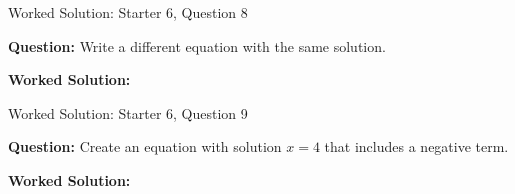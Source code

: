 \documentclass{beamer}
\newcommand{\ashow}[1]{\uncover<2->{\textcolor{red}{\small #1}}}
\begin{document}
\begin{frame}{Worked Solution: Starter 6, Question 8}

\textbf{Question:} Write a different equation with the same solution.

\textbf{Worked Solution:} \ashow{Since $3x+4=16$ gives $x=4$, a different equation is $2x+3=11$, which also gives $x=4$.}

\end{frame}

\begin{frame}{Worked Solution: Starter 6, Question 9}

\textbf{Question:} Create an equation with solution $x=4$ that includes a negative term.

\textbf{Worked Solution:} \ashow{For example, $2x-3=5$: adding $3$ gives $2x=8$, so $x=4$.}

\end{frame}

\end{document}
